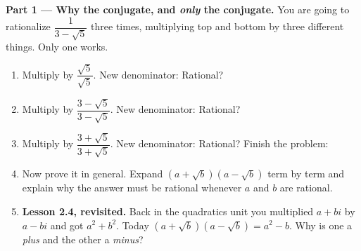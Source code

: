 \documentclass[10pt]{article}
\begin{document}
\begin{tcolorbox}[colback=white, colframe=black!40, title=\textbf{Tier E --- Extension},
    fonttitle=\bfseries, arc=1.5mm, left=3mm, right=3mm, top=2mm, bottom=2mm, breakable]
\textbf{Part 1 --- Why the conjugate, and \emph{only} the conjugate.} You are going to rationalize
$\dfrac{1}{3-\sqrt5}$ three times, multiplying top and bottom by three different things. Only one
works.
\begin{enumerate}[label=(\alph*), leftmargin=1.9em, itemsep=5pt]
  \item Multiply by $\dfrac{\sqrt5}{\sqrt5}$. New denominator: \blank{2.6cm} \; Rational?
        \blank{1.2cm}
  \item Multiply by $\dfrac{3-\sqrt5}{3-\sqrt5}$. New denominator: \blank{2.6cm} \; Rational?
        \blank{1.2cm}
  \item Multiply by $\dfrac{3+\sqrt5}{3+\sqrt5}$. New denominator: \blank{2.6cm} \; Rational?
        \blank{1.2cm} \; Finish the problem: \blank{2.6cm}
  \item Now prove it in general. Expand $\left(a+\sqrt b\right)\left(a-\sqrt b\right)$ term by term
        and explain why the answer must be rational whenever $a$ and $b$ are rational.
  \item \textbf{Lesson 2.4, revisited.} Back in the quadratics unit you multiplied $a+bi$ by
        $a-bi$ and got $a^{2}+b^{2}$. Today $\left(a+\sqrt b\right)\left(a-\sqrt b\right)=a^{2}-b$.
        Why is one a \emph{plus} and the other a \emph{minus}? \writeline
\end{enumerate}


\end{tcolorbox}
\end{document}

